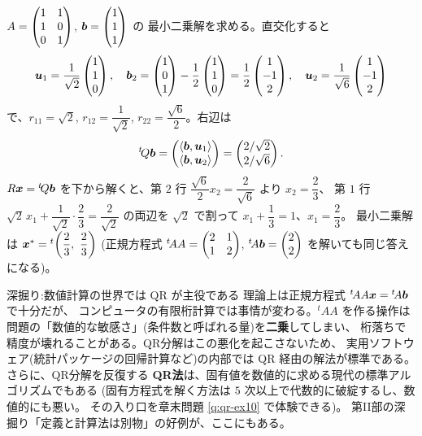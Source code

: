 \begin{rei}[QR 経由の最小二乗法]\label{rei:qr-lsq}
$A = \begin{pmatrix}1 & 1 \\ 1 & 0 \\ 0 & 1\end{pmatrix}$, $\bm{b} = \begin{pmatrix}1 \\ 1 \\ 1\end{pmatrix}$ の
最小二乗解を求める。直交化すると
\[
\bm{u}_1 = \frac{1}{\sqrt{2}}\begin{pmatrix}1 \\ 1 \\ 0\end{pmatrix}, \quad
\bm{b}_2 = \begin{pmatrix}1 \\ 0 \\ 1\end{pmatrix} - \frac{1}{2}\begin{pmatrix}1 \\ 1 \\ 0\end{pmatrix}
= \frac{1}{2}\begin{pmatrix}1 \\ -1 \\ 2\end{pmatrix}, \quad
\bm{u}_2 = \frac{1}{\sqrt{6}}\begin{pmatrix}1 \\ -1 \\ 2\end{pmatrix}
\]
で、$r_{11} = \sqrt{2}$, $r_{12} = \dfrac{1}{\sqrt{2}}$,
$r_{22} = \dfrac{\sqrt{6}}{2}$。右辺は
\[
{}^t\!Q\bm{b} = \begin{pmatrix}\langle \bm{b}, \bm{u}_1 \rangle \\
\langle \bm{b}, \bm{u}_2 \rangle\end{pmatrix}
= \begin{pmatrix}2/\sqrt{2} \\ 2/\sqrt{6}\end{pmatrix}.
\]
$R\bm{x} = {}^t\!Q\bm{b}$ を下から解くと、第 $2$ 行
$\dfrac{\sqrt{6}}{2}x_2 = \dfrac{2}{\sqrt{6}}$ より $x_2 = \dfrac{2}{3}$、
第 $1$ 行 $\sqrt{2}\,x_1 + \dfrac{1}{\sqrt{2}} \cdot \dfrac{2}{3}
= \dfrac{2}{\sqrt{2}}$ の両辺を $\sqrt{2}$ で割って
$x_1 + \dfrac{1}{3} = 1$、$x_1 = \dfrac{2}{3}$。
最小二乗解は $\bm{x}^* = {}^t\!\left(\dfrac{2}{3},\ \dfrac{2}{3}\right)$
(正規方程式 ${}^t\!AA = \begin{pmatrix}2 & 1 \\ 1 & 2\end{pmatrix}$,
${}^t\!A\bm{b} = \begin{pmatrix}2 \\ 2\end{pmatrix}$ を解いても同じ答えになる)。
\end{rei}

\begin{itembox}[l]{深掘り:数値計算の世界では QR が主役である}
理論上は正規方程式 ${}^t\!AA\bm{x} = {}^t\!A\bm{b}$ で十分だが、
コンピュータの有限桁計算では事情が変わる。${}^t\!AA$ を作る操作は
問題の「数値的な敏感さ」(条件数と呼ばれる量)を\textbf{二乗}してしまい、
桁落ちで精度が壊れることがある。QR分解はこの悪化を起こさないため、
実用ソフトウェア(統計パッケージの回帰計算など)の内部では
QR 経由の解法が標準である。さらに、QR分解を反復する
\textbf{QR法}は、固有値を数値的に求める現代の標準アルゴリズムでもある
(固有方程式を解く方法は $5$ 次以上で代数的に破綻するし、数値的にも悪い。
その入り口を章末問題 \ref{q:qr-ex10} で体験できる)。
第II部の深掘り「定義と計算法は別物」の好例が、ここにもある。
\end{itembox}

